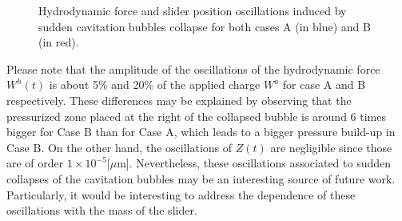 \begin{figure}[ht]
 \centering 
 \def\svgwidth{\textwidth}
 \scriptsize{
}
\caption[Hydrodynamic force and slider position oscillations induced by sudden cavitation bubbles collapse]{Hydrodynamic force and slider position oscillations induced by sudden cavitation bubbles collapse for both cases A (in blue) and B (in red).}\label{fig:cav_oscillations}
\end{figure}

Please note that the amplitude of the oscillations of the hydrodynamic force $W^h(t)$ is about 5\% and 20\% of the applied charge $W^a$ for case A and B respectively. These differences may be explained by observing that the pressurized zone placed at the right of the collapsed bubble is around 6 times bigger for Case B than for Case A, which leads to a bigger pressure build-up in Case B. On the other hand, the oscillations of $Z(t)$ are negligible since those are of order $1\times 10^{-5}$[$\mu$m]. Nevertheless, these oscillations associated to sudden collapses of the cavitation bubbles may be an interesting source of future work. Particularly, it would be interesting to address the dependence of these oscillations with the mass of the slider.
 
%
%
